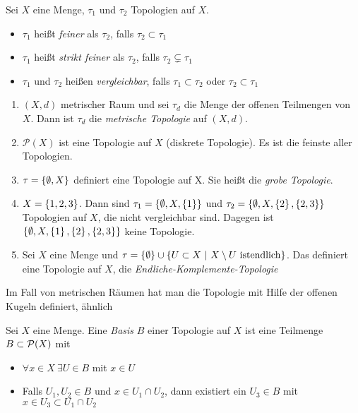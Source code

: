 \documentclass{skript}
\begin{document}
\begin{dfn}
    Sei $X$ eine Menge, $\tau_1$ und $\tau_2$ Topologien auf $X$.
    \begin{itemize}
        \item $\tau_1$ heißt \emph{feiner} als $\tau_2$, falls $\tau_2\subset\tau_1$
        \item $\tau_1$ heißt \emph{strikt feiner} als $\tau_2$, falls
            $\tau_2\subsetneq\tau_1$
        \item $\tau_1$ und $\tau_2$ heißen \emph{vergleichbar}, falls
            $\tau_1\subset\tau_2$ oder $\tau_2\subset\tau_1$
    \end{itemize}
\end{dfn}

\begin{bsps}
    \begin{enumerate}
        \item $(X,d)$ metrischer Raum und sei $\tau_d$ die Menge der offenen
            Teilmengen von $X$. Dann ist $\tau_d$ die \emph{metrische Topologie}
            auf $(X,d)$.
        \item $\mathcal{P}(X)$ ist eine Topologie auf $X$ (diskrete Topologie). Es
            ist die feinste aller Topologien.
        \item $\tau = \mdef{\emptyset, X}$ definiert eine Topologie auf X. Sie
            heißt die \emph{grobe Topologie}.
        \item $X=\mdef{1,2,3}$. Dann sind $\tau_1=\mdef{\emptyset,X,\mdef{1}}$ und
            $\tau_2=\mdef{\emptyset, X, \mdef{2}, \mdef{2,3}}$ Topologien auf $X$,
            die nicht vergleichbar sind. Dagegen ist
            $\mdef{\emptyset, X, \mdef{1}, \mdef{2}, \mdef{2,3}}$ keine Topologie.
        \item Sei $X$ eine Menge und
            $\tau = \mdef{\emptyset}\cup\mdef[U\subset X]{X\setminus U \
            \mathrm{ist endlich}}$.  Das definiert eine Topologie auf $X$, die
            \emph{Endliche-Komplemente-Topologie}
    \end{enumerate}
\end{bsps}

Im Fall von metrischen Räumen hat man die Topologie mit Hilfe der offenen Kugeln
definiert, ähnlich\begin{dfn}
    Sei $X$ eine Menge. Eine \emph{Basis} $B$ einer Topologie auf $X$ ist eine
    Teilmenge $B\subset\mathcal{P}(X)$ mit
    \begin{itemize}
        \item $\forall x\in X\ \exists U\in B$ mit $x\in U$
        \item Falls $U_1,U_2\in B$ und $x\in U_1 \cap U_2$, dann existiert ein
            $U_3 \in B$ mit $x\in U_3 \subset U_1\cap U_2$
    \end{itemize}
\end{dfn}
\end{document}
